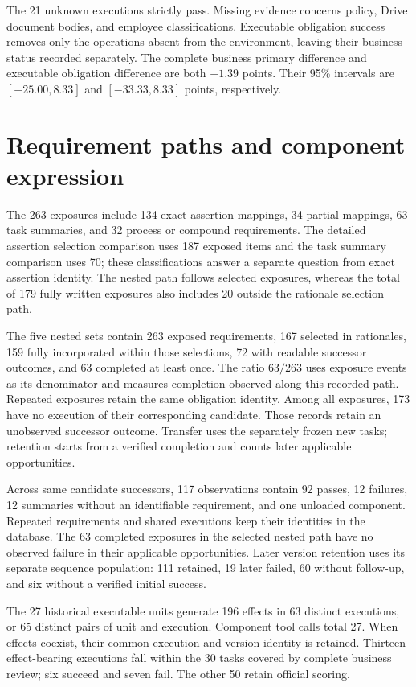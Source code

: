 The 21 unknown executions strictly pass. Missing evidence concerns policy, Drive document bodies, and employee classifications. Executable obligation success removes only the operations absent from the environment, leaving their business status recorded separately. The complete business primary difference and executable obligation difference are both $-1.39$ points. Their 95\% intervals are $[-25.00,8.33]$ and $[-33.33,8.33]$ points, respectively.

\section{Requirement paths and component expression}

The 263 exposures include 134 exact assertion mappings, 34 partial mappings, 63 task summaries, and 32 process or compound requirements. The detailed assertion selection comparison uses 187 exposed items and the task summary comparison uses 70; these classifications answer a separate question from exact assertion identity. The nested path follows selected exposures, whereas the total of 179 fully written exposures also includes 20 outside the rationale selection path.

The five nested sets contain 263 exposed requirements, 167 selected in rationales, 159 fully incorporated within those selections, 72 with readable successor outcomes, and 63 completed at least once. The ratio $63/263$ uses exposure events as its denominator and measures completion observed along this recorded path. Repeated exposures retain the same obligation identity. Among all exposures, 173 have no execution of their corresponding candidate. Those records retain an unobserved successor outcome. Transfer uses the separately frozen new tasks; retention starts from a verified completion and counts later applicable opportunities.

Across same candidate successors, 117 observations contain 92 passes, 12 failures, 12 summaries without an identifiable requirement, and one unloaded component. Repeated requirements and shared executions keep their identities in the database. The 63 completed exposures in the selected nested path have no observed failure in their applicable opportunities. Later version retention uses its separate sequence population: 111 retained, 19 later failed, 60 without follow-up, and six without a verified initial success.

The 27 historical executable units generate 196 effects in 63 distinct executions, or 65 distinct pairs of unit and execution. Component tool calls total 27. When effects coexist, their common execution and version identity is retained. Thirteen effect-bearing executions fall within the 30 tasks covered by complete business review; six succeed and seven fail. The other 50 retain official scoring.

